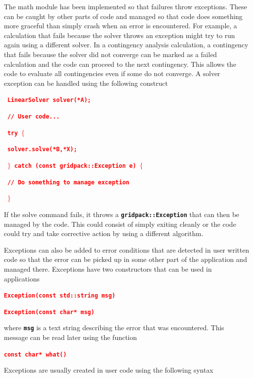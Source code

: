\documentclass[12pt]{report} %
\begin{document}
The math module has been implemented so that failures throw exceptions. These can be caught by other parts of code and managed so that code does something more graceful than simply crash when an error is encountered. For example, a calculation that fails because the solver throws an exception might try to run again using a different solver. In a contingency analysis calculation, a contingency that fails because the solver did not converge can be marked as a failed calculation and the code can proceed to the next contingency. This allows the code to evaluate all contingencies even if some do not converge.
A solver exception can be handled using the following construct

\textcolor{red}{\texttt{\textbf{    LinearSolver solver(*A);}}}

\textcolor{red}{\texttt{\textbf{    // User code...}}}

\textcolor{red}{\texttt{\textbf{    try $\boldsymbol{\mathrm{\{}}$}}}

\textcolor{red}{\texttt{\textbf{      solver.solve(*B,*X);}}}

\textcolor{red}{\texttt{\textbf{    $\boldsymbol{\mathrm{\}}}$ catch (const gridpack::Exception e) $\boldsymbol{\mathrm{\{}}$}}}

\textcolor{red}{\texttt{\textbf{      // Do something to manage exception}}}

\textcolor{red}{\texttt{\textbf{    $\boldsymbol{\mathrm{\}}}$}}}

If the solve command fails, it throws a \texttt{\textbf{gridpack::Exception}} that can then be managed by the code. This could consist of simply exiting cleanly or the code could try and take corrective action by using a different algorithm.

Exceptions can also be added to error conditions that are detected in user written code so that the error can be picked up in some other part of the application and managed there. Exceptions have two constructors that can be used in applications

\textcolor{red}{\texttt{\textbf{Exception(const std::string msg)}}}

\textcolor{red}{\texttt{\textbf{Exception(const char* msg)}}}

where \texttt{\textbf{msg}} is a text string describing the error that was encountered. This message can be read later using the function

\textcolor{red}{\texttt{\textbf{const char* what()}}}

Exceptions are usually created in user code using the following syntax
\end{document}
